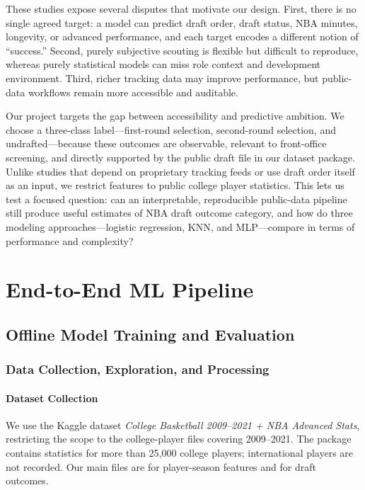These studies expose several disputes that motivate our design. First, there is no single agreed target: a model can predict draft order, draft status, NBA minutes, longevity, or advanced performance, and each target encodes a different notion of ``success.'' Second, purely subjective scouting is flexible but difficult to reproduce, whereas purely statistical models can miss role context and development environment. Third, richer tracking data may improve performance, but public-data workflows remain more accessible and auditable.

Our project targets the gap between accessibility and predictive ambition. We choose a three-class label---first-round selection, second-round selection, and undrafted---because these outcomes are observable, relevant to front-office screening, and directly supported by the public draft file in our dataset package. Unlike studies that depend on proprietary tracking feeds or use draft order itself as an input, we restrict features to public college player statistics. This lets us test a focused question: can an interpretable, reproducible public-data pipeline still produce useful estimates of NBA draft outcome category, and how do three modeling approaches---logistic regression, KNN, and MLP---compare in terms of performance and complexity?

\section{End-to-End ML Pipeline}

\subsection{Offline Model Training and Evaluation}

\subsubsection{Data Collection, Exploration, and Processing}

\paragraph{Dataset Collection}
We use the Kaggle dataset \textit{College Basketball 2009--2021 + NBA Advanced Stats}, restricting the scope to the college-player files covering 2009--2021. The package contains statistics for more than 25,000 college players; international players are not recorded. Our main files are  for player-season features and  for draft outcomes.


